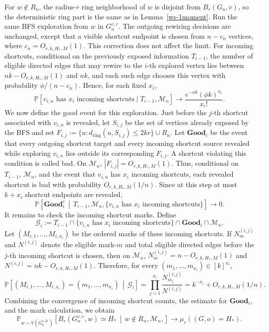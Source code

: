 \documentclass[10pt]{amsart}
\begin{document}
For \(w\notin R_n\), the radius-\(r\) ring neighborhood of \(w\) is
disjoint from \(B_r(G_n,v)\), so the deterministic ring part is the same as in
Lemma~\ref{ws-1moment}. Run the same BFS exploration from \(w\) in \(G_n^{v,r}\). The outgoing rewiring
decisions are unchanged, except that a visible shortcut endpoint is chosen from
\(n-c_n\) vertices, where \(c_n=O_{r,k,H_*,M}(1)\). This correction does not
affect the limit. For incoming shortcuts, conditional on the previously exposed
information \(T_{i-1}\), the number of eligible directed edges that may rewire
to the \(i\)-th explored vertex lies between \(nk-O_{r,k,H_*,M}(1)\) and
\(nk\), and each such edge chooses this vertex with probability
\(\phi/(n-c_n)\). Hence, for each fixed \(x_i\),
\[
\mathbb P\!\left[
v_{i,n}\text{ has }x_i\text{ incoming shortcuts}\mid T_{i-1},\mathcal M_n
\right]
\to
\frac{e^{-\phi k}(\phi k)^{x_i}}{x_i!}.
\]
We now define the good event for this exploration. Just before the \(j\)-th
shortcut associated with \(v_{i,n}\) is revealed, let \(S_{i,j}\) be the set of
vertices already exposed by the BFS and set
\(F_{i,j}:=\{u:d_{\mathrm{ring}}(u,S_{i,j})\le 2kr\}\cup R_n\). Let
\(\mathbf{Good}_i\) be the event that every outgoing shortcut target and every
incoming shortcut source revealed while exploring \(v_{i,n}\) lies outside its
corresponding \(F_{i,j}\). A shortcut violating this condition is called bad.
On \(\mathcal M_n\), \(|F_{i,j}|=O_{r,k,H_*,M}(1)\). Thus, conditional on
\(T_{i-1}\), \(\mathcal M_n\), and the event that \(v_{i,n}\) has \(x_i\)
incoming shortcuts, each revealed shortcut is bad with probability
\(O_{r,k,H_*,M}(1/n)\). Since at this step at most \(k+x_i\) shortcut endpoints
are revealed,
\[
    \mathbb P\!\left[
    \mathbf{Good}_i^c
    \,\middle|\,
    T_{i-1},\mathcal M_n,
    \{v_{i,n}\text{ has }x_i\text{ incoming shortcuts}\}
    \right]\to0 .
\]
It remains to check the incoming shortcut marks. Define
\[
    \mathcal G_i:=
    T_{i-1}\cap
    \{v_{i,n}\text{ has }x_i\text{ incoming shortcuts}\}\cap
    \mathbf{Good}_i\cap \mathcal M_n .
\]
Let \((M_{i,1},\dots,M_{i,x_i})\) be the ordered marks of these incoming
shortcuts. If \(N_m^{(i,j)}\) and \(N^{(i,j)}\) denote the eligible mark-\(m\)
and total eligible directed edges before the \(j\)-th incoming shortcut is
chosen, then on \(\mathcal M_n\), \(N_m^{(i,j)}=n-O_{r,k,H_*,M}(1)\) and
\(N^{(i,j)}=nk-O_{r,k,H_*,M}(1)\). Therefore, for every
\((m_1,\dots,m_{x_i})\in[k]^{x_i}\),
\[
\mathbb P\!\left[
(M_{i,1},\dots,M_{i,x_i})=(m_1,\dots,m_{x_i})
\,\middle|\,\mathcal G_i
\right]
=
\prod_{j=1}^{x_i}\frac{N_{m_j}^{(i,j)}}{N^{(i,j)}}
=
k^{-x_i}+O_{r,k,H_*,M}(1/n).
\]
Combining the convergence of incoming shortcut counts, the estimate for
\(\mathbf{Good}_i\), and the mark calculation, we obtain
\[
    \mathbb P_{w\sim V(G_n^{v,2r})}\!\left[
    B_r(G_n^{v,r},w)\simeq H_* \,\middle|\,  w \notin R_n, \mathcal M_n, 
    \right]
    \to \mu_r((G,o)=H_*).
\]
\end{document}
